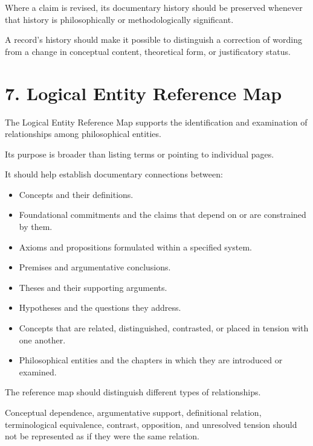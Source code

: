 Where a claim is revised, its documentary history
should be preserved whenever that history is
philosophically or methodologically significant.

A record's history should make it possible
to distinguish a correction of wording from
a change in conceptual content, theoretical
form, or justificatory status.


\section*{7. Logical Entity Reference Map}

The Logical Entity Reference Map supports
the identification and examination of relationships
among philosophical entities.

Its purpose is broader than listing terms
or pointing to individual pages.

It should help establish documentary connections
between:

\begin{itemize}
    \item Concepts and their definitions.
    \item Foundational commitments and the claims
    that depend on or are constrained by them.
    \item Axioms and propositions formulated
    within a specified system.
    \item Premises and argumentative conclusions.
    \item Theses and their supporting arguments.
    \item Hypotheses and the questions they address.
    \item Concepts that are related, distinguished,
    contrasted, or placed in tension with one another.
    \item Philosophical entities and the chapters
    in which they are introduced or examined.
\end{itemize}

The reference map should distinguish different
types of relationships.

Conceptual dependence, argumentative support,
definitional relation, terminological equivalence,
contrast, opposition, and unresolved tension
should not be represented as if they were
the same relation.

